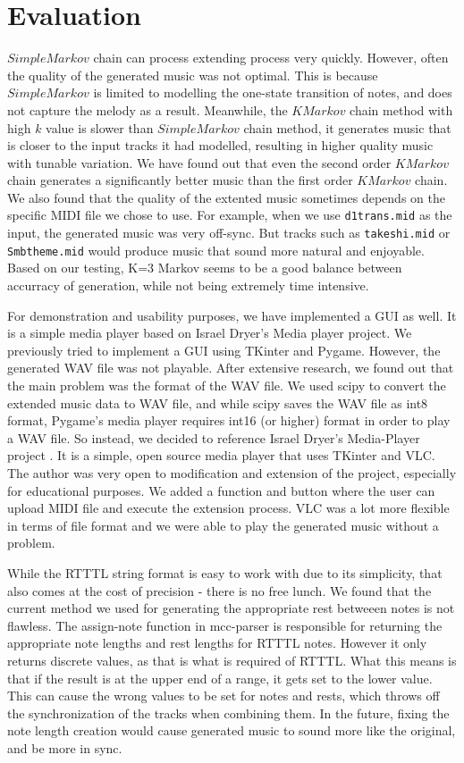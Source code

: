 \documentclass{article}
\begin{document}
\section{Evaluation}
$SimpleMarkov$ chain can process extending process very quickly. However, often the quality of the generated music was not optimal. This is because $SimpleMarkov$ is limited to 
modelling the one-state transition of notes, and does not capture the melody as a result. 
Meanwhile, the $KMarkov$ chain method with high $k$ value is slower than $SimpleMarkov$ chain method, it generates music that is closer to the input tracks it had modelled, 
resulting in higher quality music with tunable variation. We have found out that even the second order $KMarkov$ chain generates a significantly better music than the first order $KMarkov$ chain. 
We also found that the quality of the extented music sometimes depends on the specific MIDI file we chose to use.
For example, when we use \texttt{d1trans.mid} as the input, the generated music was very off-sync. But tracks such as \texttt{takeshi.mid} or \texttt{Smbtheme.mid} would produce music that sound more 
natural and enjoyable. Based on our testing, K=3 Markov seems to be a good balance between accurracy of generation, while not being extremely time intensive.

For demonstration and usability purposes, we have implemented a GUI as well. It is a simple media player based on Israel Dryer's Media player project. We previously tried 
to implement a GUI using TKinter and Pygame. However, the generated WAV file was not playable. After extensive research, we found out that the main problem was the format 
of the WAV file. We used scipy to convert the extended music data to WAV file, and while scipy saves the WAV file as int8 format,
Pygame's media player requires int16 (or higher) format in order to play a WAV file. So instead, we decided to reference Israel Dryer's Media-Player project \cite{media_player}.
It is a simple, open source media player that uses TKinter and VLC. The author was very open to modification and extension of the project, especially for educational purposes.
We added a function and button where the user can upload MIDI file and execute the extension process. VLC was a lot more flexible in terms of file format and we were able 
to play the generated music without a problem.

While the RTTTL string format is easy to work with due to its simplicity, that also comes at the cost of precision - there is no free lunch. We found that the current method 
we used for generating the appropriate rest betweeen notes is not flawless. The assign-note function in mcc-parser is responsible for returning the appropriate note lengths 
and rest lengths for RTTTL notes. However it only returns discrete values, as that is what is required of RTTTL. What this means is that if the result is at the upper end of a 
range, it gets set to the lower value. This can cause the wrong values to be set for notes and rests, which throws off the synchronization of the tracks when combining them. 
In the future, fixing the note length creation would cause generated music to sound more like the original, and be more in sync.
\end{document}
